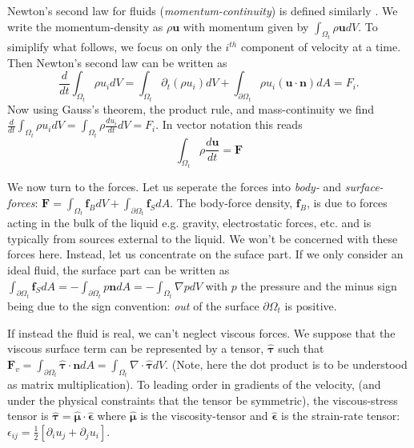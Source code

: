 \documentclass[rmp,aps,nofootinbib,superscriptaddress,floatfix]{revtex4-2}
\begin{document}
Newton's second law for fluids (\emph{momentum-continuity}) is defined similarly \cite{schoeffel2014lecture,mcdonough2009lectures}. We write the momentum-density as $\rho \bm{u}$ with momentum given by $\int_{\Omega_t} \rho \bm{u} dV$. To simiplify what follows, we focus on only the $i^{th}$ component of velocity at a time. Then Newton's second law can be written as 
\begin{equation}
    \frac{d}{dt} \int_{\Omega_t} \rho u_i dV =  \int_{\Omega_t} \partial_t (\rho u_i) dV+\int_{\partial \Omega_t} \rho u_i ( \bm{u} \cdot \bm{n}) dA = F_i.
\end{equation}
Now using Gauss's theorem, the product rule, and mass-continuity we find $ \frac{d}{dt} \int_{\Omega_t} \rho u_i dV =  \int_{\Omega_t} \rho \frac{d u_i}{dt} dV = F_i $. In vector notation this reads
\begin{equation}
    \int_{\Omega_t} \rho \frac{d \bm{u}}{dt} = \bm{F}
    \label{eq:mom_continuity}
\end{equation}

We now turn to the forces. Let us seperate the forces into \emph{body-} and \emph{surface-forces}: $\bm{F}=\int_{\Omega_t} \bm{f}_B dV+ \int_{\partial \Omega_t} \bm{f}_S dA $. The body-force density, $\bm{f}_B$, is due to forces acting in the bulk of the liquid e.g. gravity, electrostatic forces, etc. and is typically from sources external to the liquid. We won't be concerned with these forces here. Instead, let us concentrate on the suface part. If we only consider an ideal fluid, the surface part can be written as $\int_{\partial \Omega_t} \bm{f}_S dA =-\int_{\partial \Omega_t} p \bm{n} dA = -\int_{\Omega_t}\nabla p dV$ with $p$ the pressure  and the minus sign being due to the sign convention: \emph{out} of the surface $\partial \Omega_t$ is positive. 

If instead the fluid is real, we can't neglect viscous forces. We suppose that the viscous surface term can be represented by a tensor, $\hat{\bm{\tau}}$ such that $\bm{F}_v=\int_{\partial \Omega_t} \hat{\bm{\tau}}\cdot \bm{n} dA = \int_{\Omega_t} \nabla \cdot \hat{\bm{\tau}} dV$. (Note, here the dot product is to be understood as matrix multiplication). To leading order in gradients of the velocity, (and under the physical constraints that the tensor be symmetric), the viscous-stress tensor is $\hat{\bm{\tau}}=\hat{\bm{\mu}}\cdot \hat{\bm{\epsilon}}$ where $\hat{\bm{\mu}}$ is the viscosity-tensor and $\hat{\bm{\epsilon}}$ is the strain-rate tensor: $\epsilon_{ij}=\frac{1}{2}\left[ \partial_i u_j+ \partial_j u_i \right]$. 
\end{document}
